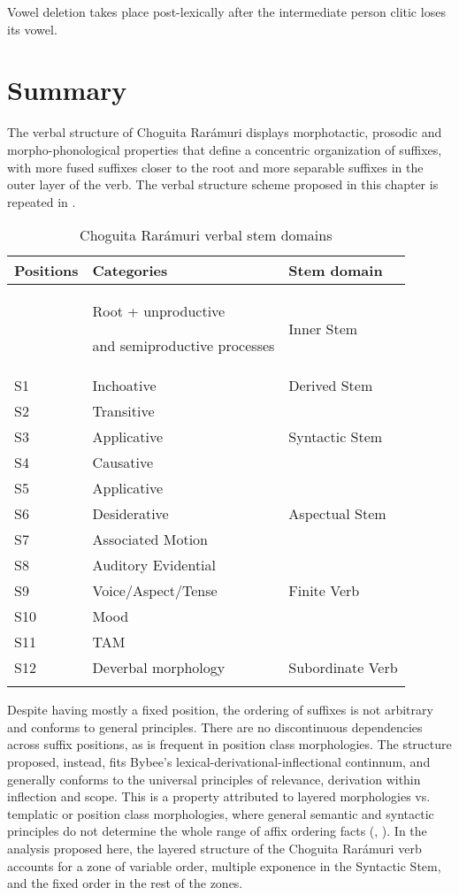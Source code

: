Vowel deletion takes place post-lexically after the intermediate person clitic loses its vowel.

\section{Summary}
\label{sec: chapter summary}

The verbal structure of Choguita Rarámuri displays morphotactic, prosodic and morpho-phonological properties that define a concentric organization of suffixes, with more fused suffixes closer to the root and more separable suffixes in the outer layer of the verb. The verbal structure scheme proposed in this chapter is repeated in .

\begin{table}[t]
\caption{Choguita Rarámuri verbal stem domains}
\label{tab:stem-levels}

\begin{tabularx}{.85\textwidth}{lQl}
\lsptoprule
\textbf{Positions} & \textbf{Categories}  & \textbf{Stem domain}\\
\midrule
 & {Root + unproductive}

 {and semiproductive processes} & {Inner Stem}\\
S1 & Inchoative & {Derived Stem}\\
S2 & Transitive & \\
S3 & Applicative & {Syntactic Stem} \\
S4 & Causative & \\
S5 & Applicative & \\
S6 & Desiderative & {Aspectual Stem}  \\
S7 & Associated Motion & \\
S8 & Auditory Evidential & \\
S9 & Voice/Aspect/Tense & {Finite Verb}\\
S10 & Mood & \\
S11 & TAM & \\
S12 & Deverbal morphology & {Subordinate Verb}\\
\lspbottomrule
\end{tabularx}
\end{table}

Despite having mostly a fixed position, the ordering of suffixes is not arbitrary and conforms to general principles. There are no discontinuous dependencies across suffix positions, as is frequent in position class morphologies. The structure proposed, instead, fits Bybee’s lexical-derivational-inflectional continnum, and generally conforms to the universal principles of relevance, derivation within inflection and scope. This is a property attributed to layered morphologies vs. templatic or position class morphologies, where general semantic and syntactic principles do not determine the whole range of affix ordering facts (\citealt{bickel2007inflectional}, \citealt{stump1993position}). In the analysis proposed here, the layered structure of the Choguita Rarámuri verb accounts for a zone of variable order, multiple exponence in the Syntactic Stem, and the fixed order in the rest of the zones.

\newpage

~

